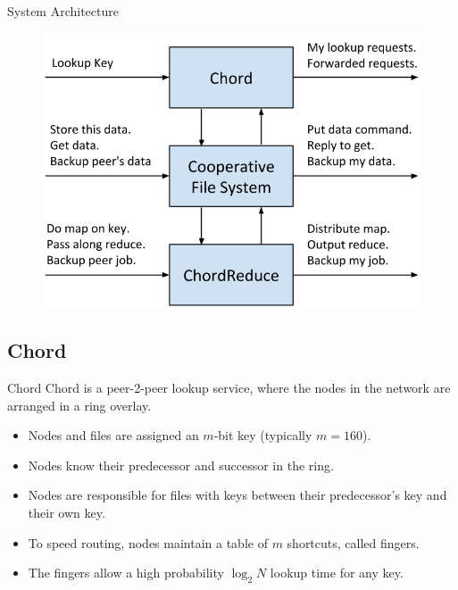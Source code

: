 \documentclass[11pt]{beamer}
\begin{document}
\begin{frame}{System Architecture}
\begin{figure}
    \includegraphics[width=0.8\linewidth]{CR_architecture}

\end{figure}
\end{frame}


\subsection{Chord}

\begin{frame}{Chord}
Chord is a peer-2-peer lookup service, where the nodes in the network are arranged in a ring overlay.
\begin{itemize}
	\item Nodes and files are assigned an $m$-bit key (typically $m=160$).
	\item Nodes know their predecessor and successor in the ring.
	\item Nodes are responsible for files with keys between their predecessor's key and their own key.
	\item To speed routing, nodes maintain a table of $m$ shortcuts, called fingers.
	\item The fingers allow a high probability $\log_{2} N$ lookup time for any key.
	
\end{itemize}


\end{frame}
\end{document}
